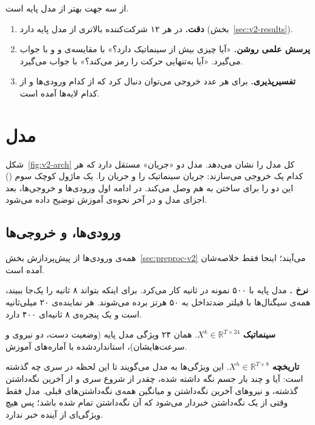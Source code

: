  از سه جهت بهتر از مدل پایه است.
\begin{enumerate}
\item \textbf{دقت.}  در هر ۱۲ شرکت‌کننده  بالاتری از مدل پایه دارد (بخش~\ref{sec:v2-results}).
\item \textbf{پرسش علمی روشن.} «آیا  چیزی بیش از سینماتیک دارد؟» با مقایسه‌ی  و  و با  جواب می‌گیرد. «آیا  به‌تنهایی حرکت را رمز می‌کند؟» با  جواب می‌گیرد.
\item \textbf{تفسیرپذیری.} برای هر عدد خروجی می‌توان دنبال کرد که از کدام ورودی‌ها و از کدام لایه‌ها آمده است.
\end{enumerate}

\FloatBarrier
\section{مدل }
\label{sec:v2}

شکل~\ref{fig:v2-arch} کل مدل را نشان می‌دهد. مدل دو «جریان» مستقل دارد که هر کدام یک خروجی می‌سازند: جریان سینماتیک  را و جریان   را. یک ماژول کوچک سوم () این دو را برای ساختن  به هم وصل می‌کند. در ادامه اول ورودی‌ها و خروجی‌ها، بعد اجزای مدل و در آخر نحوه‌ی آموزش توضیح داده می‌شود.

\subsection{ورودی‌ها،  و خروجی‌ها}

همه‌ی ورودی‌ها از پیش‌پردازش بخش~\ref{sec:preproc-v2} می‌آیند؛ اینجا فقط خلاصه‌شان آمده است.

\textbf{نرخ .} مدل پایه با ۵۰۰ نمونه در ثانیه کار می‌کرد. برای اینکه  بتواند ۸ ثانیه را یک‌جا ببیند، همه‌ی سیگنال‌ها با فیلتر ضدتداخل به ۵۰ هرتز برده می‌شوند. هر  نماینده‌ی ۲۰ میلی‌ثانیه است و یک پنجره‌ی ۸ ثانیه‌ای ۴۰۰  دارد.

\textbf{سینماتیک} $X^{k}\in\mathbb{R}^{T\times24}$. همان ۲۴ ویژگی مدل پایه (وضعیت دست، دو نیروی  و سرعت‌هایشان)، استانداردشده با آماره‌های آموزش.

\textbf{تاریخچه} $X^{h}\in\mathbb{R}^{T\times8}$. این ویژگی‌ها به مدل می‌گویند تا این لحظه در سری چه گذشته است: آیا و چند بار جسم نگه داشته شده، چقدر از شروع سری و از آخرین نگه‌داشتن گذشته، و نیروهای آخرین نگه‌داشتن و میانگین همه‌ی نگه‌داشتن‌های قبلی. مدل فقط وقتی از یک نگه‌داشتن خبردار می‌شود که آن نگه‌داشتن تمام شده باشد؛ پس هیچ ویژگی‌ای از آینده خبر ندارد.

